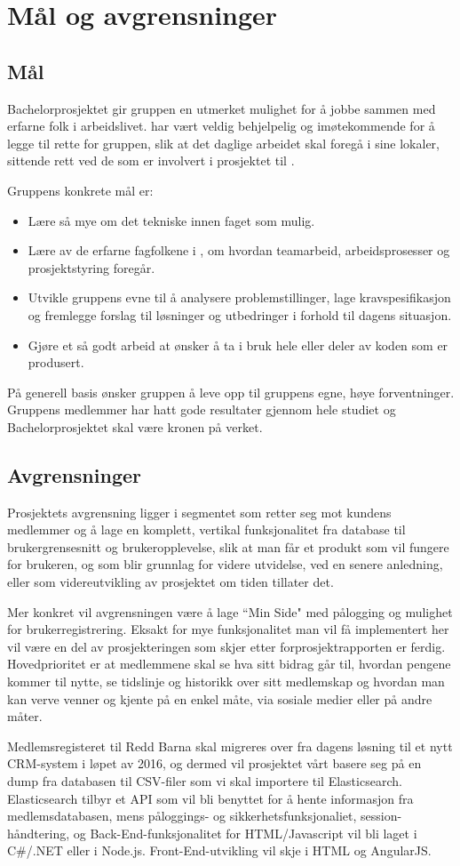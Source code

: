 \chapter{Mål og avgrensninger}
\section{Mål}
Bachelorprosjektet gir gruppen en utmerket mulighet for å jobbe sammen med erfarne folk i arbeidslivet. \mw{} har vært veldig behjelpelig og imøtekommende for å legge til rette for gruppen, slik at det daglige arbeidet skal foregå i \mw{} sine lokaler, sittende rett ved de som er involvert i prosjektet til \rb{}.

Gruppens konkrete mål er:
\begin{itemize}
\item Lære så mye om det tekniske innen faget som mulig.
\item Lære av de erfarne fagfolkene i \mw{}, om hvordan teamarbeid, arbeidsprosesser og prosjektstyring foregår.
\item Utvikle gruppens evne til å analysere problemstillinger, lage kravspesifikasjon og fremlegge forslag til løsninger og utbedringer i forhold til dagens situasjon.
\item Gjøre et så godt arbeid at \mw{} ønsker å ta i bruk hele eller deler av koden som er produsert.
\end{itemize}

På generell basis ønsker gruppen å leve opp til gruppens egne, høye forventninger. Gruppens medlemmer har hatt gode resultater gjennom hele studiet og Bachelorprosjektet skal være kronen på verket.

\section{Avgrensninger}
Prosjektets avgrensning ligger i segmentet som retter seg mot kundens medlemmer og å lage en komplett, vertikal funksjonalitet fra database til brukergrensesnitt og brukeropplevelse, slik at man får et produkt som vil fungere for brukeren, og som blir grunnlag for videre utvidelse, ved en senere anledning, eller som videreutvikling av prosjektet om tiden tillater det.

Mer konkret vil avgrensningen være å lage ``Min Side" med pålogging og mulighet for brukerregistrering. Eksakt for mye funksjonalitet man vil få implementert her vil være en del av prosjekteringen som skjer etter forprosjektrapporten er ferdig. Hovedprioritet er at medlemmene skal se hva sitt bidrag går til, hvordan pengene kommer til nytte, se tidslinje og historikk over sitt medlemskap og hvordan man kan verve venner og kjente på en enkel måte, via sosiale medier eller på andre måter.

Medlemsregisteret til Redd Barna skal migreres over fra dagens løsning til et nytt CRM-system i løpet av 2016, og dermed vil prosjektet vårt basere seg på en dump fra databasen til CSV-filer som vi skal importere til Elasticsearch. Elasticsearch tilbyr et API som vil bli benyttet for å hente informasjon fra medlemsdatabasen, mens påloggings- og sikkerhetsfunksjonaliet, session-håndtering, og Back-End-funksjonalitet for HTML/Javascript vil bli laget i C\#/.NET eller i Node.js. Front-End-utvikling vil skje i HTML og AngularJS.